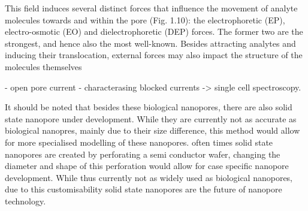 This field induces several distinct forces that influence
the movement of analyte molecules towards and within the pore (Fig. 1.10):
the electrophoretic (EP), electro-osmotic (EO) and dielectrophoretic (DEP)
forces. The former two are the strongest, and hence also the most well-known.
Besides attracting analytes and inducing their translocation, external forces may
also impact the structure of the molecules themselves

- open pore current
- characterasing blocked currents -> single cell spectroscopy.

It should be noted that besides these biological nanopores, there are also solid state
nanopore under development. While they are currently not as accurate as biological
nanopres, mainly due to their size difference, this method would allow for more
specialised modelling of these nanopores. often times solid state nanopores are created
by perforating a semi conductor wafer, changing the diameter and shape of this
perforation would allow for  case specific nanopore development. While thus currently not
as widely used as biological nanopores, due to this customisability solid state nanopores
are the future of nanopore technology.
